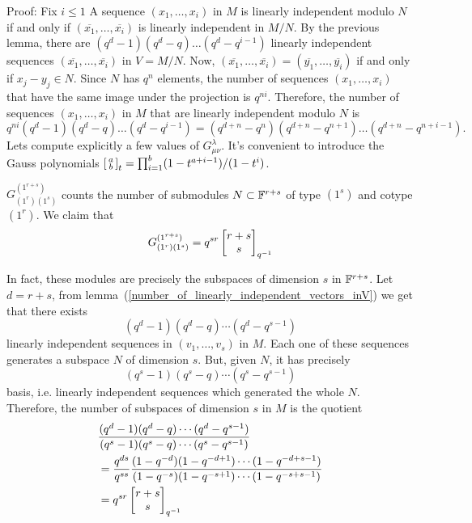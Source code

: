 Proof: Fix $i\leq1$ A sequence $(x_1,\dots,x_i)$ in $M$ is linearly independent modulo $N$ if and only if $(\overline{x_1},\dots,\overline{x_i})$ is linearly independent in $M/N$.  By the previous lemma, there are $(q^d-1)(q^d-q)\dots(q^d-q^{i-1})$ linearly independent sequences $(\overline{x_1},\dots,\overline{x_i})$ in $V=M/N$. Now, $(\overline{x_1},\dots,\overline{x_i})=(\overline{y_1},\dots,\overline{y_i})$ if and only if $x_j-y_j\in N$. Since $N$ has $q^n$ elements, the number of sequences $(x_1,\dots,x_i)$ that have the same image under the projection is $q^{ni}$. Therefore, the number of sequences $(x_1,\dots,x_i)$ in $M$ that are linearly independent modulo $N$ is 
\begin{equation}
    q^{ni}(q^d-1)(q^d-q)\dots(q^d-q^{i-1})=(q^{d+n}-q^n)(q^{d+n}-q^{n+1})\dots(q^{d+n}-q^{n+i-1}).
\end{equation}
Lets compute explicitly a few values of $G_{\mu\nu}^\lambda$. It's convenient to introduce the Gauss polynomials $\begin{bsmallmatrix} a\\b\end{bsmallmatrix}_{t}=\prod_{i=1}^b(1-t^{a+i-1})/(1-t^i)$.
\begin{dang}
    \begin{example}
       $G_{(1^r)(1^s)}^{(1^{r+s})}$ counts the number of submodules $N\subset \mathbb{F}^{r+s}$ of type $(1^s)$ and cotype $(1^r)$. We claim that 
       \begin{equation}
           G_{(1^r)(1^s)}^{(1^{r+s})}=q^{sr}\begin{bmatrix} r+s\\s\end{bmatrix}_{q^{-1}}
       \end{equation}
    \end{example}
\end{dang}
In fact, these modules are precisely the subspaces of dimension $s$ in $\mathbb{F}^{r+s}$. Let $d=r+s$, from lemma~(\ref{number_of_linearly_independent_vectors_inV}) 
we get that there exists 
       \begin{equation}
           (q^d-1)(q^d-q)\cdots(q^d-q^{s-1})
       \end{equation}
       linearly independent sequences in $(v_1,\dots,v_s)$ in $M$. Each one of these sequences generates a subspace $N$ of dimension $s$. But, given $N$, it has precisely 
       \begin{equation}
           (q^s-1)(q^s-q)\cdots(q^s-q^{s-1})
       \end{equation}
       basis, i.e. linearly independent sequences which generated the whole $N$. Therefore, the number of subspaces of dimension $s$ in $M$ is the quotient
       \begin{equation}
       \begin{split}
              &\frac{(q^d-1)(q^d-q)\cdots(q^d-q^{s-1})}{(q^s-1)(q^s-q)\cdots(q^s-q^{s-1})}\\
              &=\frac{q^{ds}}{q^{ss}}\frac{(1-q^{-d})(1-q^{-d+1})\cdots(1-q^{-d+s-1})}{(1-q^{-s})(1-q^{-s+1})\cdots(1-q^{-s+ s-1})}\\
              &=q^{sr}\begin{bmatrix} r+s\\s\end{bmatrix}_{q^{-1}}
       \end{split}
       \end{equation}
